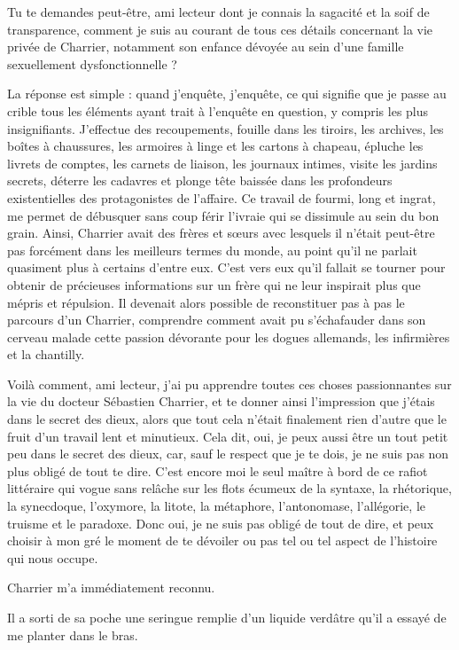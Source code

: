 Tu te demandes peut-être, ami lecteur dont je connais la sagacité et la soif de transparence, comment je suis au courant de tous ces détails concernant la vie privée de Charrier, notamment son enfance dévoyée au sein d’une famille sexuellement dysfonctionnelle ?

La réponse est simple : quand j’enquête, j’enquête, ce qui signifie que je passe au crible tous les éléments ayant trait à l’enquête en question, y compris les plus insignifiants. J’effectue des recoupements, fouille dans les tiroirs, les archives, les boîtes à chaussures, les armoires à linge et les cartons à chapeau, épluche les livrets de comptes, les carnets de liaison, les journaux intimes, visite les jardins secrets, déterre les cadavres et plonge tête baissée dans les profondeurs existentielles des protagonistes de l’affaire. Ce travail de fourmi, long et ingrat, me permet de débusquer sans coup férir l’ivraie qui se dissimule au sein du bon grain. Ainsi, Charrier avait des frères et sœurs avec lesquels il n’était peut-être pas forcément dans les meilleurs termes du monde, au point qu’il ne parlait quasiment plus à certains d’entre eux. C’est vers eux qu’il fallait se tourner pour obtenir de précieuses informations sur un frère qui ne leur inspirait plus que mépris et répulsion. Il devenait alors possible de reconstituer pas à pas le parcours d’un Charrier, comprendre comment avait pu s’échafauder dans son cerveau malade cette passion dévorante pour les dogues allemands, les infirmières et la chantilly.

Voilà comment, ami lecteur, j’ai pu apprendre toutes ces choses passionnantes sur la vie du docteur Sébastien Charrier, et te donner ainsi l’impression que j’étais dans le secret des dieux, alors que tout cela n’était finalement rien d’autre que le fruit d’un travail lent et minutieux. Cela dit, oui, je peux aussi être un tout petit peu dans le secret des dieux, car, sauf le respect que je te dois, je ne suis pas non plus obligé de tout te dire. C’est encore moi le seul maître à bord de ce rafiot littéraire qui vogue sans relâche sur les flots écumeux de la syntaxe, la rhétorique, la synecdoque, l’oxymore, la litote, la métaphore, l’antonomase, l’allégorie, le truisme et le paradoxe. Donc oui, je ne suis pas obligé de tout de dire, et peux choisir à mon gré le moment de te dévoiler ou pas tel ou tel aspect de l’histoire qui nous occupe.

Charrier m’a immédiatement reconnu.

Il a sorti de sa poche une seringue remplie d’un liquide verdâtre qu’il a essayé de me planter dans le bras.


